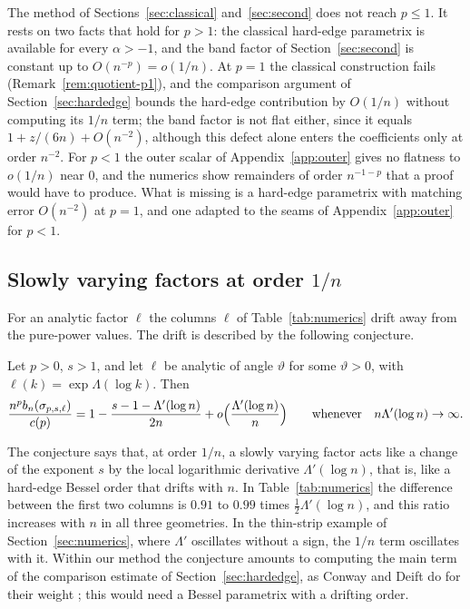 The method of Sections~\ref{sec:classical} and~\ref{sec:second} does not reach $p\le1$. It rests on two facts that hold
for $p>1$: the classical hard-edge parametrix is available for every $\alpha>-1$, and the band factor of
Section~\ref{sec:second} is constant up to $O(n^{-p})=o(1/n)$. At $p=1$ the classical construction fails
(Remark~\ref{rem:quotient-p1}), and the comparison argument of Section~\ref{sec:hardedge} bounds the hard-edge
contribution by $O(1/n)$ without computing its $1/n$ term; the band factor is not flat either, since it equals
$1+z/(6n)+O(n^{-2})$, although this defect alone enters the coefficients only at order $n^{-2}$. For $p<1$ the outer
scalar of Appendix~\ref{app:outer} gives no flatness to $o(1/n)$ near $0$, and the numerics show remainders of order
$n^{-1-p}$ that a proof would have to produce. What is missing is a hard-edge parametrix with matching error
$O(n^{-2})$ at $p=1$, and one adapted to the seams of Appendix~\ref{app:outer} for $p<1$.

\subsection{Slowly varying factors at order \texorpdfstring{$1/n$}{1/n}}\label{sec:tilt}
For an analytic factor $\ell$ the columns $\ell$ of Table~\ref{tab:numerics} drift away from the pure-power values. The
drift is described by the following conjecture.

\begin{conjecture}\label{conj:tilt}
Let $p>0$, $s>1$, and let $\ell$ be analytic of angle $\vartheta$ for some $\vartheta>0$, with
$\ell(k)=\exp\Lambda(\log k)$. Then
\[
  \frac{n^pb_n(\sigma_{p,s,\ell})}{c(p)}=1-\frac{s-1-\Lambda'(\log n)}{2n}+o\Bigl(\frac{\Lambda'(\log n)}{n}\Bigr)
  \qquad\text{whenever}\quad n\Lambda'(\log n)\to\infty.
\]
\end{conjecture}

The conjecture says that, at order $1/n$, a slowly varying factor acts like a change of the exponent $s$ by the local
logarithmic derivative $\Lambda'(\log n)$, that is, like a hard-edge Bessel order that drifts with $n$. In
Table~\ref{tab:numerics} the difference between the first two columns is $0.91$ to $0.99$ times
$\frac12\Lambda'(\log n)$, and this ratio increases with $n$ in all three geometries. In the thin-strip example of
Section~\ref{sec:numerics}, where $\Lambda'$ oscillates without a sign, the $1/n$ term oscillates with it. Within our
method the conjecture amounts to computing the main term of the comparison estimate of Section~\ref{sec:hardedge}, as
Conway and Deift do for their weight \cite[(5.5)]{CD}; this would need a Bessel parametrix with a drifting order.

